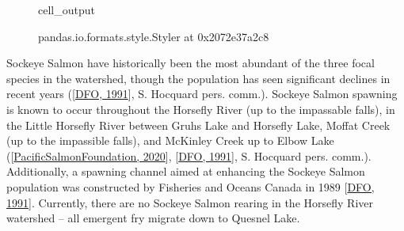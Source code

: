 \documentclass[letterpaper,10pt,english]{jupyterBook}
\begin{document}
\begin{figure}[htbp]
\centering
\capstart
\begin{sphinxVerbatimOutput}

\begin{sphinxuseclass}{cell_output}
\begin{sphinxVerbatim}[commandchars=\\\{\}]
\PYGZlt{}pandas.io.formats.style.Styler at 0x2072e37a2c8\PYGZgt{}
\end{sphinxVerbatim}

\end{sphinxuseclass}\end{sphinxVerbatimOutput}
\caption{}\label{\detokenize{Planning:table6}}\end{figure}

\sphinxAtStartPar
Sockeye Salmon have historically been the most abundant of the three focal species in the watershed, though the population has seen significant declines in recent years ({[}\hyperlink{cite.references:id11}{DFO, 1991}{]}, S. Hocquard pers. comm.). Sockeye Salmon spawning is known to occur throughout the Horsefly River (up to the impassable falls), in the Little Horsefly River between Gruhs Lake and Horsefly Lake, Moffat Creek (up to the impassible falls), and McKinley Creek up to Elbow Lake ({[}\hyperlink{cite.references:id19}{Pacific\sphinxhyphen{}Salmon\sphinxhyphen{}Foundation, 2020}{]}, {[}\hyperlink{cite.references:id11}{DFO, 1991}{]}, S. Hocquard pers. comm.). Additionally, a spawning channel aimed at enhancing the Sockeye Salmon population was constructed by Fisheries and Oceans Canada in 1989 {[}\hyperlink{cite.references:id11}{DFO, 1991}{]}. Currently, there are no Sockeye Salmon rearing in the Horsefly River watershed – all emergent fry migrate down to Quesnel Lake.

\sphinxstepscope
\end{document}
